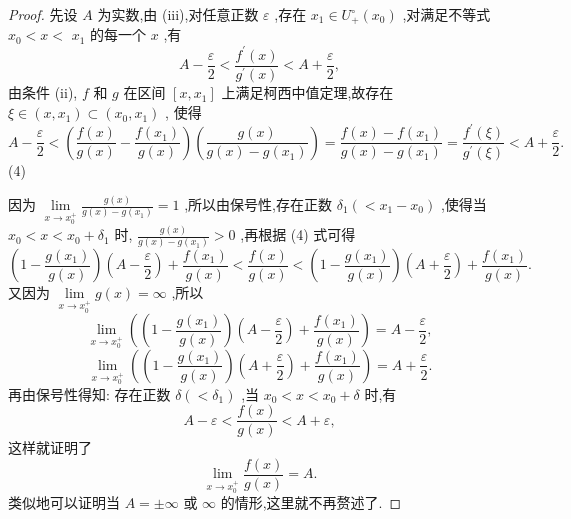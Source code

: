 \begin{proof}
先设 \(A\) 为实数,由 (iii),对任意正数 \(\varepsilon\) ,存在 \({x}_{1} \in  {U}_{ + }^{ \circ  }\left( {x}_{0}\right)\) ,对满足不等式 \({x}_{0} < x <\)  \({x}_{1}\) 的每一个 \(x\) ,有
\[
A - \frac{\varepsilon }{2} < \frac{{f}^{\prime }\left( x\right) }{{g}^{\prime }\left( x\right) } < A + \frac{\varepsilon }{2}, \tag{3}
\]
由条件 (ii), \(f\) 和 \(g\) 在区间 \(\left\lbrack  {x,{x}_{1}}\right\rbrack\) 上满足柯西中值定理,故存在 \(\xi  \in  \left( {x,{x}_{1}}\right)  \subset  \left( {{x}_{0},{x}_{1}}\right)\) , 使得
\[
A - \frac{\varepsilon }{2} < \left( {\frac{f\left( x\right) }{g\left( x\right) } - \frac{f\left( {x}_{1}\right) }{g\left( x\right) }}\right) \left( \frac{g\left( x\right) }{g\left( x\right)  - g\left( {x}_{1}\right) }\right)  = \frac{f\left( x\right)  - f\left( {x}_{1}\right) }{g\left( x\right)  - g\left( {x}_{1}\right) } = \frac{{f}^{\prime }\left( \xi \right) }{{g}^{\prime }\left( \xi \right) } < A + \frac{\varepsilon }{2}.
\]
(4)

因为 \(\mathop{\lim }\limits_{{x \rightarrow  {x}_{0}^{ + }}}\frac{g\left( x\right) }{g\left( x\right)  - g\left( {x}_{1}\right) } = 1\) ,所以由保号性,存在正数 \({\delta }_{1}\left( { < {x}_{1} - {x}_{0}}\right)\) ,使得当 \({x}_{0} < x < {x}_{0} + {\delta }_{1}\) 时, \(\frac{g\left( x\right) }{g\left( x\right)  - g\left( {x}_{1}\right) } > 0\) ,再根据 (4) 式可得
\[
\left( {1 - \frac{g\left( {x}_{1}\right) }{g\left( x\right) }}\right) \left( {A - \frac{\varepsilon }{2}}\right)  + \frac{f\left( {x}_{1}\right) }{g\left( x\right) } < \frac{f\left( x\right) }{g\left( x\right) } < \left( {1 - \frac{g\left( {x}_{1}\right) }{g\left( x\right) }}\right) \left( {A + \frac{\varepsilon }{2}}\right)  + \frac{f\left( {x}_{1}\right) }{g\left( x\right) }. \tag{5}
\]
又因为 \(\mathop{\lim }\limits_{{x \rightarrow  {x}_{0}^{ + }}}g\left( x\right)  = \infty\) ,所以
\[
\mathop{\lim }\limits_{{x \rightarrow  {x}_{0}^{ + }}}\left( {\left( {1 - \frac{g\left( {x}_{1}\right) }{g\left( x\right) }}\right) \left( {A - \frac{\varepsilon }{2}}\right)  + \frac{f\left( {x}_{1}\right) }{g\left( x\right) }}\right)  = A - \frac{\varepsilon }{2},
\]
\[
\mathop{\lim }\limits_{{x \rightarrow  {x}_{0}^{ + }}}\left( {\left( {1 - \frac{g\left( {x}_{1}\right) }{g\left( x\right) }}\right) \left( {A + \frac{\varepsilon }{2}}\right)  + \frac{f\left( {x}_{1}\right) }{g\left( x\right) }}\right)  = A + \frac{\varepsilon }{2}.
\]
再由保号性得知: 存在正数 \(\delta \left( { < {\delta }_{1}}\right)\) ,当 \({x}_{0} < x < {x}_{0} + \delta\) 时,有
\[
A - \varepsilon  < \frac{f\left( x\right) }{g\left( x\right) } < A + \varepsilon ,
\]
这样就证明了
\[
\mathop{\lim }\limits_{{x \rightarrow  {x}_{0}^{ + }}}\frac{f\left( x\right) }{g\left( x\right) } = A.
\]
类似地可以证明当 \(A =  \pm  \infty\) 或 \(\infty\) 的情形,这里就不再赘述了.
\end{proof}


